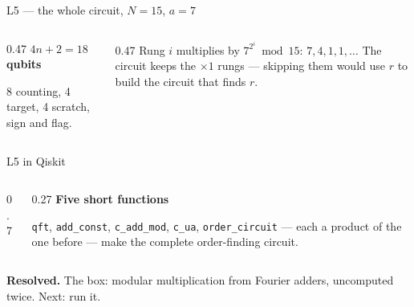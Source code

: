 \documentclass[aspectratio=169,11pt]{beamer}
\newcommand{\cnt}[1]{\textcolor{cblue}{#1}}
\newcommand{\tgt}[1]{\textcolor{cverm}{#1}}
\newcommand{\blocktitle}[1]{{\bfseries #1}\par\vskip1mm}
\newcommand{\resolved}[1]{\begin{takeaway}\textbf{Resolved.} #1\end{takeaway}}
\newcommand{\code}[2][]{}
\newcommand{\bundle}[3]{\draw[thick,color=body] (#1-0.07,#2-0.13) -- (#1+0.07,#2+0.13);
  \node[font=\tiny,color=subtle,above right=-1pt] at (#1,#2) {#3};}
\begin{document}
\begin{frame}{L5 --- the whole circuit, $N=15$, $a=7$}
  \centering
  \vskip1mm
  \begin{columns}[T]
    \begin{column}{0.47\textwidth}
      \blocktitle{$4n+2=18$ qubits}
      \cnt{8 counting}, \tgt{4 target}, 4 scratch, sign and flag.
    \end{column}
    \begin{column}{0.47\textwidth}
      {\small Rung $i$ multiplies by $7^{2^i}\bmod15$: $7,4,1,1,\dots$ The circuit keeps the $\times1$ rungs --- skipping them would use $r$ to build the circuit that finds $r$.}
    \end{column}
  \end{columns}
\end{frame}

\begin{frame}[fragile]{L5 in Qiskit}
  \begin{columns}[T]
    \begin{column}{0.7\textwidth}
      \code[basicstyle=\ttfamily\scriptsize]{order_circuit.py}
    \end{column}
    \begin{column}{0.27\textwidth}
      \blocktitle{Five short functions}
      \texttt{qft}, \texttt{add\_const}, \texttt{c\_add\_mod}, \texttt{c\_ua}, \texttt{order\_circuit} --- each a product of the one before --- make the complete order-finding circuit.
    \end{column}
  \end{columns}
  \resolved{The box: modular multiplication from Fourier adders, uncomputed twice. Next: run it.}
\end{frame}
\end{document}
